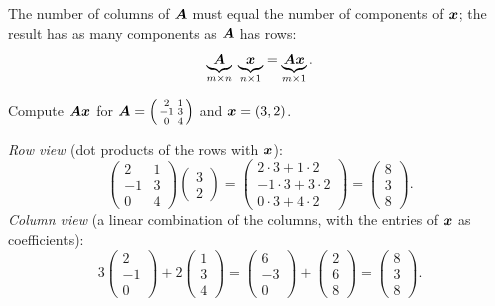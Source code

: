 The number of columns of $\bm{A}$ must equal the number of components of $\bm{x}$;
the result has as many components as $\bm{A}$ has rows:
\[
  \underbrace{\bm{A}}_{m\times n}\;\underbrace{\bm{x}}_{n\times 1}
  = \underbrace{\bm{A}\bm{x}}_{m\times1}.
\]

\begin{example}\label{ex:matrix-vector}
Compute $\bm{A}\bm{x}$ for
$\bm{A} = \left(\begin{smallmatrix} 2 & 1\\ -1 & 3\\ 0 & 4\end{smallmatrix}\right)$
and $\bm{x} = (3, 2)$.

\sol \emph{Row view} (dot products of the rows with $\bm{x}$):
\[
  \begin{pmatrix} 2 & 1\\ -1 & 3\\ 0 & 4\end{pmatrix}
  \begin{pmatrix} 3\\ 2\end{pmatrix}
  = \begin{pmatrix} 2\cdot3 + 1\cdot2\\ -1\cdot3 + 3\cdot2\\ 0\cdot3 + 4\cdot2
    \end{pmatrix}
  = \begin{pmatrix} 8\\ 3\\ 8\end{pmatrix}.
\]
\emph{Column view} (a linear combination of the columns, with the entries of
$\bm{x}$ as coefficients):
\[
  3\begin{pmatrix} 2\\ -1\\ 0\end{pmatrix}
  + 2\begin{pmatrix} 1\\ 3\\ 4\end{pmatrix}
  = \begin{pmatrix} 6\\ -3\\ 0\end{pmatrix}
  + \begin{pmatrix} 2\\ 6\\ 8\end{pmatrix}
  = \begin{pmatrix} 8\\ 3\\ 8\end{pmatrix}.
\]
\end{example}

